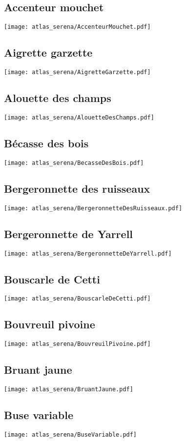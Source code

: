 \subsection{Accenteur mouchet}
\texttt{[image: atlas\_serena/AccenteurMouchet.pdf]}
\subsection{Aigrette garzette}
\texttt{[image: atlas\_serena/AigretteGarzette.pdf]}
\subsection{Alouette des champs}
\texttt{[image: atlas\_serena/AlouetteDesChamps.pdf]}
\subsection{Bécasse des bois}
\texttt{[image: atlas\_serena/BecasseDesBois.pdf]}
\subsection{Bergeronnette des ruisseaux}
\texttt{[image: atlas\_serena/BergeronnetteDesRuisseaux.pdf]}
\subsection{Bergeronnette de Yarrell}
\texttt{[image: atlas\_serena/BergeronnetteDeYarrell.pdf]}
\subsection{Bouscarle de Cetti}
\texttt{[image: atlas\_serena/BouscarleDeCetti.pdf]}
\subsection{Bouvreuil pivoine}
\texttt{[image: atlas\_serena/BouvreuilPivoine.pdf]}
\subsection{Bruant jaune}
\texttt{[image: atlas\_serena/BruantJaune.pdf]}
\subsection{Buse variable}
\texttt{[image: atlas\_serena/BuseVariable.pdf]}
